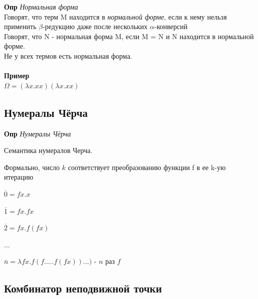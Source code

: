 \textbf{Опр} \textit{Нормальная форма}\\ Говорят, что терм M находится в \textit{нормальной форме}, если к нему нельзя применить $\beta$-редукцию даже после нескольких $\alpha$-конверсий\\ Говорят, что N - нормальная форма M, если M = N и N находится в нормальной форме.
\\
Не у всех термов есть нормальная форма.\\  \\
\textbf{Пример}\\
$\Omega = (\lambda x.xx)(\lambda x.xx)$

\subsection{Нумералы Чёрча}

\textbf{Опр} \textit{Нумералы Чёрча}

Семантика нумералов Черча.

Формально, число $k$ соответствует преобразованию функции f в ее k-ую итерацию

\begin{center}
    $\overline{0} = fx.x$
    
    $\overline{1} = fx.fx$
    
    $\overline{2} = fx.f(fx)$
    
    $\dots$
    
    $\overline{n} = \lambda fx. f(f.....f(fx))...)$ - $n$ раз $f$
\end{center}

\subsection{Комбинатор неподвижной точки}

